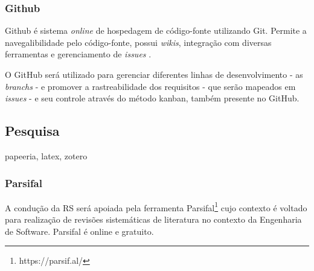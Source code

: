 \subsubsection{Github}

Github é sistema \textit{online} de hospedagem de código-fonte utilizando Git. Permite a navegalibilidade pelo código-fonte, possui \textit{wikis}, integração com diversas ferramentas e gerenciamento de \textit{issues} \cite{github2016}.

O GitHub será utilizado para gerenciar diferentes linhas de desenvolvimento - as \textit{branchs} - e promover a rastreabilidade dos requisitos - que serão mapeados em \textit{issues} - e seu controle através do método kanban, também presente no GitHub.

\subsection{Pesquisa}

papeeria, latex, zotero

\subsubsection{Parsifal}

A condução da RS será apoiada pela ferramenta Parsifal\footnote{https://parsif.al/} cujo contexto é voltado para realização de revisões sistemáticas de literatura no contexto da Engenharia de Software. Parsifal é online e gratuito.


